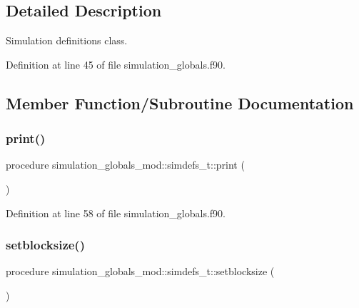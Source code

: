 \subsection{Detailed Description}
Simulation definitions class. 

Definition at line 45 of file simulation\+\_\+globals.\+f90.



\subsection{Member Function/\+Subroutine Documentation}
\mbox{\label{structsimulation__globals__mod_1_1simdefs__t_a135110b50bcbd621d80df8f7b31fa60e}} 
\subsubsection{\texorpdfstring{print()}{print()}}
{\footnotesize\ttfamily procedure simulation\+\_\+globals\+\_\+mod\+::simdefs\+\_\+t\+::print (\begin{DoxyParamCaption}{ }\end{DoxyParamCaption})\hspace{0.3cm}{\ttfamily [private]}}



Definition at line 58 of file simulation\+\_\+globals.\+f90.

\mbox{\label{structsimulation__globals__mod_1_1simdefs__t_ae55e67ff6ecd7045526f099a4bb77fac}} 
\subsubsection{\texorpdfstring{setblocksize()}{setblocksize()}}
{\footnotesize\ttfamily procedure simulation\+\_\+globals\+\_\+mod\+::simdefs\+\_\+t\+::setblocksize (\begin{DoxyParamCaption}{ }\end{DoxyParamCaption})\hspace{0.3cm}{\ttfamily [private]}}




